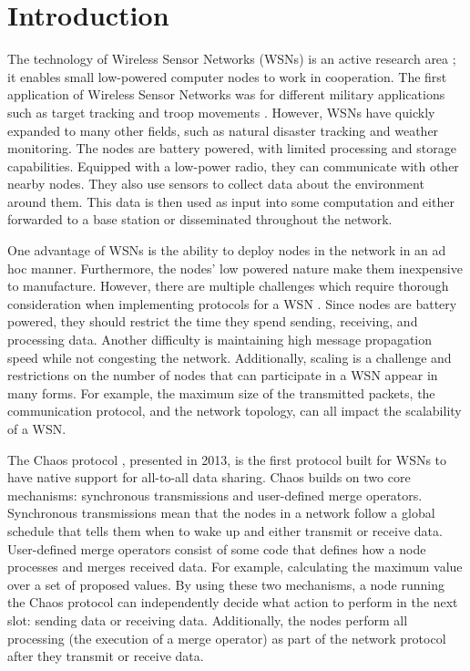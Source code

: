 \chapter{Introduction}
The technology of Wireless Sensor Networks (WSNs) is an active research area \cite{Yick2008-wsn-survey, Mahmood2015-reliability-survey}; it enables small low-powered computer nodes to work in cooperation. The first application of Wireless Sensor Networks was for different military applications such as target tracking and troop movements \cite{Yick2008-wsn-survey}. However, WSNs have quickly expanded to many other fields, such as natural disaster tracking and weather monitoring. The nodes are battery powered, with limited processing and storage capabilities. Equipped with a low-power radio, they can communicate with other nearby nodes. They also use sensors to collect data about the environment around them. This data is then used as input into some computation and either forwarded to a base station or disseminated throughout the network.

One advantage of WSNs is the ability to deploy nodes in the network in an ad hoc manner. Furthermore, the nodes' low powered nature make them inexpensive to manufacture. However, there are multiple challenges which require thorough consideration when implementing protocols for a WSN \cite{Yick2008-wsn-survey}. Since nodes are battery powered, they should restrict the time they spend sending, receiving, and processing data. Another difficulty is maintaining high message propagation speed while not congesting the network. Additionally, scaling is a challenge and restrictions on the number of nodes that can participate in a WSN appear in many forms. For example, the maximum size of the transmitted packets, the communication protocol, and the network topology, can all impact the scalability of a WSN.


The Chaos protocol \cite{chaos-introduction-paper}, presented in 2013, is the first protocol built for WSNs to have native support for all-to-all data sharing. Chaos builds on two core mechanisms: synchronous transmissions and user-defined merge operators. Synchronous transmissions mean that the nodes in a network follow a global schedule that tells them when to wake up and either transmit or receive data. User-defined merge operators consist of some code that defines how a node processes and merges received data. For example, calculating the maximum value over a set of proposed values. By using these two mechanisms, a node running the Chaos protocol can independently decide what action to perform in the next slot: sending data or receiving data. Additionally, the nodes perform all processing (the execution of a merge operator) as part of the network protocol after they transmit or receive data.

